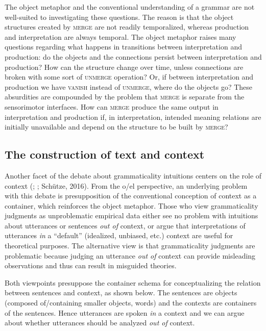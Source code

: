   The object metaphor and the conventional understanding of a grammar are not well-suited to investigating these questions. The reason is that the object structures created by \textsc{merge} are not readily temporalized, whereas production and interpretation are always temporal. The object metaphor raises many questions regarding what happens in transitions between interpretation and production: do the objects and the connections persist between interpretation and production? How can the structure change over time, unless connections are broken with some sort of \textsc{unmerge} operation? Or, if between interpretation and production we have \textsc{vanish} instead of \textsc{unmerge}, where do the objects go? These absurdities are compounded by the problem that \textsc{merge} is separate from the sensorimotor interfaces. How can \textsc{merge} produce the same output in interpretation and production if, in interpretation, intended meaning relations are initially unavailable and depend on the structure to be built by \textsc{merge?} 

\subsection{The construction of text and context}

Another facet of the debate about grammaticality intuitions centers on the role of context (\citealt{Bolinger1965}; \citealt{Keller2000}; Schütze, 2016). From the o/el perspective, an underlying problem with this debate is presupposition of the conventional conception of context as a container, which reinforces the object metaphor. Those who view grammaticality judgments as unproblematic empirical data either  see no problem with intuitions about utterances or sentences \textit{out of} context, or  argue that interpretations of utterances \textit{in} a “default” (idealized, unbiased, etc.) context are useful for theoretical purposes. The alternative view is that grammaticality judgments are problematic because judging an utterance \textit{out of} context can provide misleading observations and thus can result in misguided theories.

  Both viewpoints presuppose the container schema for conceptualizing the relation between sentences and context, as shown below. The sentences are objects (composed of/containing smaller objects, words) and the contexts are containers of the sentences. Hence utterances are spoken \textit{in} a context and we can argue about whether utterances should be analyzed \textit{out of} context.   

